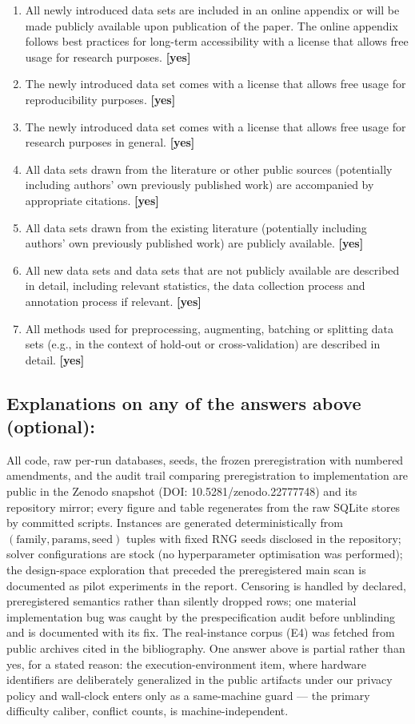 \documentclass[manuscript, screen, review]{jair}
\begin{document}
\begin{enumerate}
    \item All newly introduced data sets are included in an online appendix or will be made publicly available upon publication of the paper. The online appendix follows best practices for long-term accessibility with a license that allows free usage for research purposes.
    \textbf{[yes]}
    \item The newly introduced data set comes with a license that allows free usage for reproducibility purposes.
    \textbf{[yes]}
    \item The newly introduced data set comes with a license that allows free usage for research purposes in general.
    \textbf{[yes]}
    \item All data sets drawn from the literature or other public sources (potentially including authors' own previously published work) are accompanied by appropriate citations.
    \textbf{[yes]}
    \item All data sets drawn from the existing literature (potentially including authors' own previously published work) are publicly available.
    \textbf{[yes]}
    \item All new data sets and data sets that are not publicly available are described in detail, including relevant statistics, the data collection process and annotation process if relevant.
    \textbf{[yes]}
    \item All methods used for preprocessing, augmenting, batching or splitting data sets (e.g., in the context of hold-out or cross-validation) are described in detail.
    \textbf{[yes]}
\end{enumerate}

\subsection*{Explanations on any of the answers above (optional):}

All code, raw per-run databases, seeds, the frozen preregistration with
numbered amendments, and the audit trail comparing preregistration to
implementation are public in the Zenodo snapshot (DOI:
10.5281/zenodo.22777748) and its repository mirror; every figure and table
regenerates from the raw SQLite stores by committed scripts. Instances are generated deterministically from
$(\text{family}, \text{params}, \text{seed})$ tuples with fixed RNG seeds
disclosed in the repository; solver configurations are stock (no
hyperparameter optimisation was performed); the design-space exploration that
preceded the preregistered main scan is documented as pilot experiments in the
report. Censoring is handled by declared, preregistered semantics rather than
silently dropped rows; one material implementation bug was caught by the
prespecification audit before unblinding and is documented with its fix. The
real-instance corpus (E4) was fetched from public archives cited in the
bibliography. One answer above is partial rather than yes, for a stated
reason: the execution-environment item, where hardware identifiers are
deliberately generalized in the public artifacts under our privacy policy and
wall-clock enters only as a same-machine guard --- the primary difficulty
caliber, conflict counts, is machine-independent.
\end{document}
